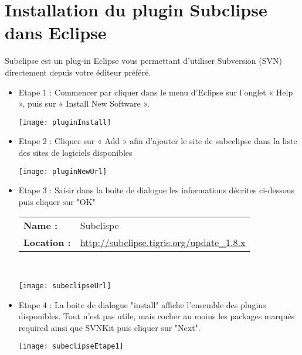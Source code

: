 % 

\section{Installation du plugin Subclipse dans Eclipse}

Subclipse est un plug-in Eclipse vous permettant d'utiliser Subversion (SVN) directement depuis votre \'editeur pr\'ef\'er\'e.

\begin{itemize}[leftmargin=* ,parsep=0cm,itemsep=0cm,topsep=0cm]

\medskip

\item Etape 1 : Commencer par cliquer dans le menu d’Eclipse sur l'onglet « Help », puis sur « Install New Software ».
\begin{center}
\texttt{[image: pluginInstall]}
\end{center}

\item Etape 2 : Cliquer sur « Add » afin d’ajouter le site de subeclipse dans la liste des sites de logiciels disponibles
\begin{center}
\texttt{[image: pluginNewUrl]}
\end{center}

\item Etape 3 : Saisir dans la boite de dialogue les informations d\'ecrites ci-dessous puis cliquer sur "OK"\\

\begin{tabular}[!t]{ll}
{\bf Name : }&{Subclispe}\\
{\bf Location : }&{\href{http://subclipse.tigris.org/update_1.8.x}{http://subclipse.tigris.org/update\_1.8.x}}\\
\end{tabular}\\
\smallskip
\begin{center}
\texttt{[image: subeclipseUrl]}
\end{center}

\newpage

\item Etape 4 : La boite de dialogue "install" affiche l'ensemble des plugins disponibles. Tout n’est pas utile, mais cocher au moins les packages marqu\'es required ainsi que SVNKit puis cliquer sur "Next".
\begin{center}
\texttt{[image: subeclipseEtape1]}
\end{center}


\end{itemize}
